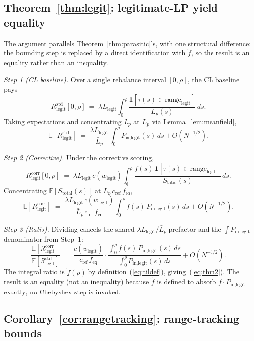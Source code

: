 \documentclass[11pt,a4paper]{article}
\theoremstyle{definition}
\theoremstyle{plain}
\theoremstyle{remark}
\begin{document}
\subsection*{Theorem~\ref{thm:legit}: legitimate-LP yield equality}

The argument parallels Theorem~\ref{thm:parasitic}'s, with one structural difference: the bounding step is replaced by a direct identification with $\tilde f$, so the result is an equality rather than an inequality.

\noindent\emph{Step 1 (CL baseline).} Over a single rebalance interval $[0, \rho]$, the CL baseline pays
\[
R^{\text{std}}_{\text{legit}}[0, \rho] \;=\; \lambda L_{\text{legit}} \int_0^\rho \frac{\mathbf{1}[\tau(s) \in \text{range}_{\text{legit}}]}{L_p(s)}\,ds.
\]
Taking expectations and concentrating $L_p$ at $\bar L_p$ via Lemma~\ref{lem:meanfield},
\[
\mathbb{E}[R^{\text{std}}_{\text{legit}}] \;=\; \frac{\lambda L_{\text{legit}}}{\bar L_p} \int_0^\rho P_{\text{in,legit}}(s)\,ds + O(N^{-1/2}).
\]

\noindent\emph{Step 2 (Corrective).} Under the corrective scoring,
\[
R^{\text{corr}}_{\text{legit}}[0, \rho] \;=\; \lambda L_{\text{legit}}\,c(w_{\text{legit}}) \int_0^\rho \frac{f(s)\,\mathbf{1}[\tau(s) \in \text{range}_{\text{legit}}]}{S_{\text{total}}(s)}\,ds.
\]
Concentrating $\mathbb{E}[S_{\text{total}}(s)]$ at $\bar L_p\,c_{\text{ref}}\,f_{\text{eq}}$,
\[
\mathbb{E}[R^{\text{corr}}_{\text{legit}}] \;=\; \frac{\lambda L_{\text{legit}}\,c(w_{\text{legit}})}{\bar L_p\,c_{\text{ref}}\,f_{\text{eq}}} \int_0^\rho f(s)\,P_{\text{in,legit}}(s)\,ds + O(N^{-1/2}).
\]

\noindent\emph{Step 3 (Ratio).} Dividing cancels the shared $\lambda L_{\text{legit}}/\bar L_p$ prefactor and the $\int P_{\text{in,legit}}$ denominator from Step~1:
\[
\frac{\mathbb{E}[R^{\text{corr}}_{\text{legit}}]}{\mathbb{E}[R^{\text{std}}_{\text{legit}}]} \;=\; \frac{c(w_{\text{legit}})}{c_{\text{ref}}\, f_{\text{eq}}} \cdot \frac{\int_0^\rho f(s)\,P_{\text{in,legit}}(s)\,ds}{\int_0^\rho P_{\text{in,legit}}(s)\,ds} + O(N^{-1/2}).
\]
The integral ratio is $\tilde f(\rho)$ by definition~(\ref{eq:tildef}), giving~(\ref{eq:thm2}). The result is an equality (not an inequality) because $\tilde f$ is defined to absorb $f \cdot P_{\text{in,legit}}$ exactly; no Chebyshev step is invoked.

\subsection*{Corollary~\ref{cor:rangetracking}: range-tracking bounds}
\end{document}
